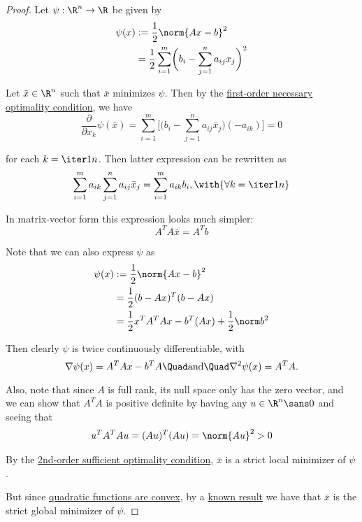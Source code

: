 \begin{proof}
  \def\dx{\Delta x}
  Let $\psi:\R^n\to\R$ be given by
  \begin{align*}
    \psi(x) &:=\frac12\norm{Ax-b}^2                                        \\
            &=\frac12\sum_{i=1}^m\biggl(b_i-\sum_{j=1}^na_{ij}x_j\biggr)^2
  \end{align*}

  Let $\bar x\in\R^n$ such that $\bar x$ minimizes $\psi$. Then by the
  \href{dc165c9}{first-order necessary optimality condition}, we have
  \begin{equation*}
    \frac{\partial}{\partial x_k}\psi(\bar x)
    =\sum_{i=1}^m\biggl[\biggl(b_i-\sum_{j=1}^na_{ij}\bar x_j\biggr)(-a_{ik})\biggr]=0
  \end{equation*}

  for each $k=\iter1n$. Then latter expression can be rewritten as
  $$
    \sum_{i=1}^ma_{ik}\sum_{j=1}^na_{ij}\bar x_j=\sum_{i=1}^ma_{ik}b_i,\with{\forall k=\iter1n}
  $$

  In matrix-vector form this expression looks much simpler:
  $$
    A^TA\bar x=A^Tb
  $$

  Note that we can also express $\psi$ as
  \begin{align*}
    \psi(x) &:=\frac12\norm{Ax-b}^2                    \\
            &=\frac12(b-Ax)^T(b-Ax)                    \\
            &=\frac12x^TA^TAx-b^T(Ax)+\frac12\norm b^2
  \end{align*}

  Then clearly $\psi$ is twice continuously differentiable, with
  \begin{equation*}
    \nabla\psi(x)=A^TAx-b^TA\Quad\text{and}\Quad\nabla^2\psi(x)=A^TA.
  \end{equation*}

  Also, note that since $A$ is full rank, its null space only has the zero
  vector, and we can show that $A^TA$ is positive definite by having any
  $u\in\R^n\sans0$ and seeing that
  \begin{align*}
    u^TA^TAu=(Au)^T(Au)=\norm{Au}^2>0
  \end{align*}

  By the \href{b43d95d}{2nd-order sufficient optimality condition}, $\bar x$ is
  a strict local minimizer of $\psi$.

  But since \href{de25005}{quadratic functions are convex}, by a
  \href{f546fc9}{known result} we have that $\bar x$ is the strict global
  minimizer of $\psi$.
\end{proof}

